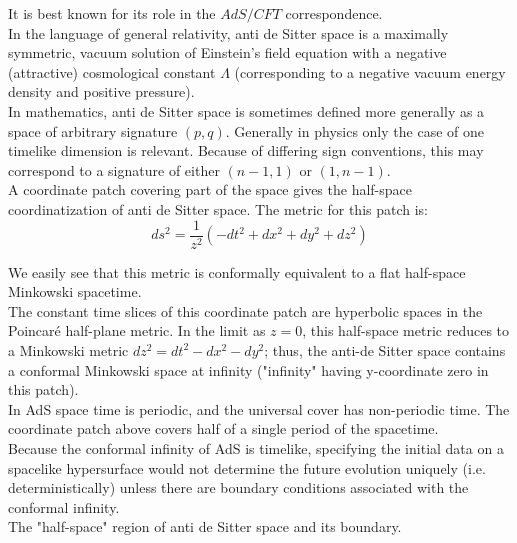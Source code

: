 It is best known for its role in the $AdS/CFT$ correspondence.\\

In the language of general relativity, anti de Sitter space is a maximally symmetric, vacuum solution of Einstein's field equation with a negative (attractive) cosmological constant $\Lambda$ (corresponding to a negative vacuum energy density and positive pressure).\\

In mathematics, anti de Sitter space is sometimes defined more generally as a space of arbitrary signature $(p,q)$. Generally in physics only the case of one timelike dimension is relevant. Because of differing sign conventions, this may correspond to a signature of either $(n−1, 1)$ or $(1, n−1)$.\\

A coordinate patch covering part of the space gives the half-space coordinatization of anti de Sitter space. The metric for this patch is:\\

\begin{equation} \label{eq:AdSCartesianMetric}
    ds^2=\frac{1}{z^2} \left(- dt^2 + dx^2 + dy^2 + dz^2 \right)
\end{equation}

We easily see that this metric is conformally equivalent to a flat half-space Minkowski spacetime.\\

The constant time slices of this coordinate patch are hyperbolic spaces in the Poincaré half-plane metric. In the limit as $z = 0$, this half-space metric reduces to a Minkowski metric $dz^2=dt^2-dx^2-dy^2$; thus, the anti-de Sitter space contains a conformal Minkowski space at infinity ("infinity" having y-coordinate zero in this patch).\\

In AdS space time is periodic, and the universal cover has non-periodic time. The coordinate patch above covers half of a single period of the spacetime.\\

Because the conformal infinity of AdS is timelike, specifying the initial data on a spacelike hypersurface would not determine the future evolution uniquely (i.e. deterministically) unless there are boundary conditions associated with the conformal infinity.\\

The "half-space" region of anti de Sitter space and its boundary.\\

